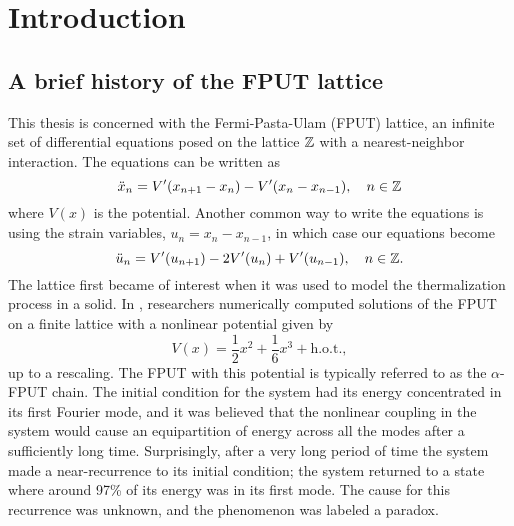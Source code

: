 
\chapter{Introduction}

\section{A brief history of the FPUT lattice}

This thesis is concerned with the Fermi-Pasta-Ulam (FPUT) lattice, an infinite set of differential equations posed on the lattice \(\mathbb{Z}\) with a nearest-neighbor interaction. The equations can be written as
\begin{equation}
	\ddot x_n = V'(x_{n+1}- x_n) - V'(x_n - x_{n-1}), \quad n\in \mathbb{Z}
\end{equation}
where \(V(x)\) is the potential. Another common way to write the equations is using the strain variables, \(u_n = x_ n - x_{n-1}\), in which case our equations become
\begin{equation}\label{fput-lattice-equations-strain-variables}
	\ddot{u}_n = V'(u_{n+1}) - 2 V'(u_n) + V'(u_{n-1}), \quad n \in \mathbb{Z}.
\end{equation}
The lattice first became of interest when it was used to model the thermalization process in a solid. In \cite{fermi1955studies}, researchers numerically computed solutions of the FPUT on a finite lattice with a nonlinear potential given by
\begin{equation}
	V(x) = \frac 1 2 x^2 + \frac 1 6 x^3 + \text{h.o.t.},
\end{equation}
up to a rescaling. The FPUT with this potential is typically referred to as the \(\alpha\)-FPUT chain. The initial condition for the system had its energy concentrated in its first Fourier mode, and it was believed that the nonlinear coupling in the system would cause an equipartition of energy across all the modes after a sufficiently long time. Surprisingly, after a very long period of time the system made a near-recurrence to its initial condition; the system returned to a state where around 97\% of its energy was in its first mode. The cause for this recurrence was unknown, and the phenomenon was labeled a paradox. 

